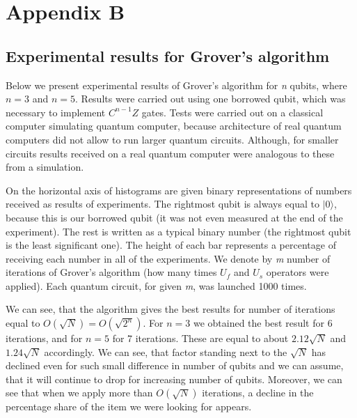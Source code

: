 \chapter{Appendix B}
\thispagestyle{chapterBeginStyle}
\label{appendixB}

\section{Experimental results for Grover's algorithm}

Below we present experimental results of Grover's algorithm for \textit{n} qubits, where $n = 3$ and $n = 5$. Results were carried out using one borrowed qubit, which was necessary to implement $C^{n-1}Z$ gates. Tests were carried out on a classical computer simulating quantum computer, because architecture of real quantum computers did not allow to run larger quantum circuits. Although, for smaller circuits results received on a real quantum computer were analogous to these from a simulation.

On the horizontal axis of histograms are given binary representations of numbers received as results of experiments. The rightmost qubit is always equal to $|0\rangle$, because this is our borrowed qubit (it was not even measured at the end of the experiment). The rest is written as a typical binary number (the rightmost qubit is the least significant one). The height of each bar represents a percentage of receiving each number in all of the experiments. We denote by \textit{m} number of iterations of Grover's algorithm (how many times $U_f$ and $U_s$ operators were applied). Each quantum circuit, for given \textit{m}, was launched 1000 times.

We can see, that the algorithm gives the best results for number of iterations equal to $O(\sqrt{N}) = O(\sqrt{2^n})$. For $n = 3$ we obtained the best result for 6 iterations, and for $n = 5$ for 7 iterations. These are equal to about $2.12 \sqrt{N}$ and $1.24 \sqrt{N}$ accordingly. We can see, that factor standing next to the $\sqrt{N}$ has declined even for such small difference in number of qubits and we can assume, that it will continue to drop for increasing number of qubits. Moreover, we can see that when we apply more than $O(\sqrt{N})$ iterations, a decline in the percentage share of the item we were looking for appears.

